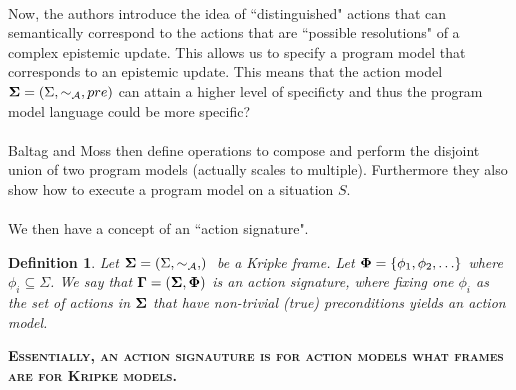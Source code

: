 \documentclass[10pt, a4paper, twoside]{article}
\newcommand{\aRel}[1] {
  \sim_{\mathcal{#1} }
}
\newcommand{\actModel}[3]{
  (#1, \aRel{#2}, #3)
}
\newcommand{\frActModel}[2] { %
  (#1, #2)
}
\newcommand{\note}[1]{\textsc{\textbf{#1}}}
\newtheorem{defn}{Definition}
\begin{document}
\\
Now, the authors introduce the idea of ``distinguished" actions that can
semantically correspond to the actions that are ``possible resolutions" of a
complex epistemic update.
This allows us to specify a program model that corresponds to an epistemic
update.
This means that the action model ${\bf \Sigma} = \actModel{\Sigma}{A}{pre}$ can
attain a higher level of specificty and thus the program model language could be
more specific?\\
\\
Baltag and Moss then define operations to compose and perform the disjoint union
of two program models (actually scales to multiple).
Furthermore they also show how to execute a program model on a situation $S$.\\
\\
We then have a concept of an ``action signature".
\begin{defn}
Let ${\bf \Sigma} = \actModel{\Sigma}{A}$ be a Kripke frame.
Let ${\bf \Phi} = \{\phi_1, \phi_2, \ldots \}$ where $\phi_i \subseteq \Sigma$.
We say that ${\bf \Gamma} = \frActModel{ {\bf \Sigma} }{ {\bf \Phi} }$ is an action
signature, where fixing one $\phi_i$ as the set of actions in ${\bf \Sigma}$ 
that have non-trivial (true) preconditions yields an action model.
\end{defn}
\note{Essentially, an action signauture is for action models what frames are
for Kripke models.}
\end{document}
